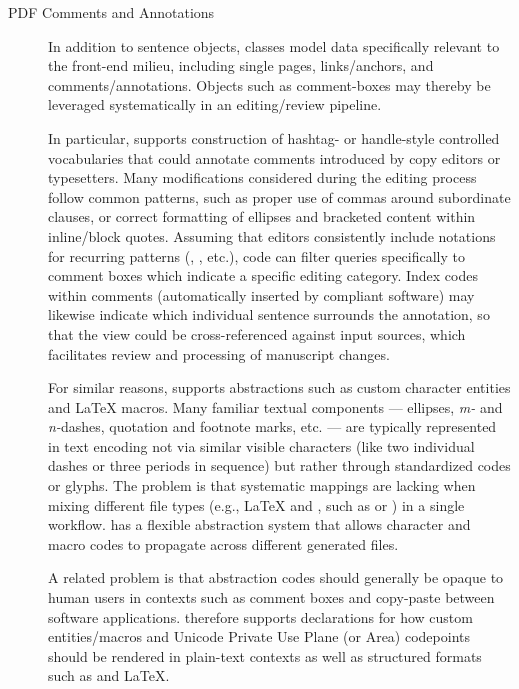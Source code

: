 \documentclass[11pt]{article}
\begin{document}
{{\begin{description}
\item[PDF Comments and Annotations]  In addition to sentence 
objects, \PacTk{} classes model data specifically relevant to 
the \PDF{} front-end milieu, including single pages, links/anchors, and 
comments/annotations.  Objects such as comment-boxes 
may thereby be leveraged systematically in an editing/review pipeline.

\pseudoIndent{} In particular, \PacTk{} supports construction of hashtag- or handle-style 
controlled vocabularies that could annotate \PDF{} comments 
introduced by copy editors or typesetters.  Many modifications considered 
during the editing process follow common patterns, such as 
proper use of commas around subordinate clauses, or correct formatting 
of ellipses and bracketed content within inline/block quotes.  Assuming 
that editors consistently include notations for recurring patterns 
(, , etc.), 
\PacTk{} code can filter queries specifically to \PDF{} comment 
boxes which indicate a specific editing category.  Index codes within 
\PDF{} comments (automatically inserted by compliant software) 
may likewise indicate which individual sentence 
surrounds the annotation, so that the \PDF{} view could be cross-referenced 
against input sources, which facilitates review and processing 
of manuscript changes.


\pseudoIndent{} For similar reasons, \PacTk{} supports abstractions 
such as \XML{} custom character entities and \LaTeX{} macros.  
Many familiar textual components --- ellipses, 
\textit{m-} and \textit{n-}dashes, 
quotation and footnote marks, etc. --- are typically represented 
in text encoding not via similar visible characters (like two individual dashes 
or three periods in sequence) but rather through standardized 
codes or glyphs.  The problem is that systematic mappings 
are lacking when mixing different file types (e.g., \LaTeX{} and 
\XML{}, such as \JATS{} or \BITS{}) in a single workflow.  
\lPacTk{} has a flexible abstraction system that allows 
character and macro codes to propagate across different 
generated files.


\pseudoIndent{} A related problem is that abstraction codes should 
generally be opaque to human users in contexts such as 
comment boxes and copy-paste between software applications.  
\lPacTk{} therefore supports declarations for how 
custom entities/macros and Unicode Private Use Plane 
(or Area) codepoints 
should be rendered in plain-text contexts as well as 
structured formats such as \XML{} and \LaTeX{}.        
 

\end{description}}}
\end{document}
